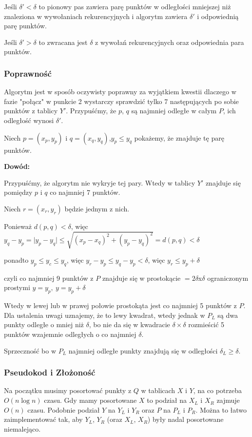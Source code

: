 \begin{itemize}
		Jeśli $\delta'<\delta$ to pionowy pas zawiera parę punktów w odległości mniejszej niż znaleziona w  wywołaniach rekurencyjnych i algorytm zawiera $\delta'$ i odpowiednią parę punktów.
		
		Jeśli $\delta'>\delta$ to zwracana jest $\delta$ z wywołań rekurencyjnych oraz odpowiednia para punktów.
\end{itemize}

\subsubsection{Poprawność}
Algorytm jest w sposób oczywisty poprawny za wyjątkiem kwestii dlaczego w fazie "połącz" w punkcie 2 wystarczy sprawdzić tylko 7 następujących po sobie punktów z tablicy $Y'$. Przypuśćmy, że $p$, $q$ są najmniej odległe w całym $P$, ich odległość wynosi $\delta'$.

Niech 
$p=(x_p,y_p)$ i $q=(x_q,y_q)$,\tab \tab $y_p \leq y_q$
pokażemy, że znajduje tę parę punktów.

\textbf{Dowód: }

Przypuśćmy, że algorytm nie wykryje tej pary. Wtedy w tablicy $Y'$ znajduje się pomiędzy $p$ i $q$ co najmniej 7 punktów.

Niech $r=(x_r,y_r)$ będzie jednym z nich.

Ponieważ $d(p,q)<\delta$, więc $y_q-y_p = \vert y_p - y_q \vert \leq \sqrt{(x_p-x_q)^2+(y_p-y_q)^2}=d(p,q)<\delta$

ponadto $y_p\leq y_c\leq y_q$, więc $y_r-y_p \leq y_q-y_p<\delta$, więc $y_r\leq y_p + \delta$

czyli co najmniej 9 punktów z $P$ znajduje się w prostokącie $=2\delta$x$\delta$ ograniczonym prostymi $y=y_p,\ y=y_p+\delta$

Wtedy w lewej lub w prawej połowie prostokąta jest co najmniej 5 punktów z $P$. Dla ustalenia uwagi uznajemy, że to lewy kwadrat, wtedy jednak w $P_L$ są dwa punkty odległe o mniej niż $\delta$, bo nie da się w kwadracie $\delta \times \delta$ rozmieścić 5 punktów wzajemnie odległych o co najmniej $\delta$.

Sprzeczność bo w $P_L$ najmniej odległe punkty znajdują się w odległości $\delta_L \geq \delta$.

\subsubsection{Pseudokod i Złożoność}
Na początku musimy posortować punkty z $Q$ w tablicach $X$ i $Y$, na co potrzeba $O(n \log n)$ czasu. Gdy mamy posortowane $X$ to podział na $X_L$ i $X_R$ zajmuje $O(n)$ czasu. Podobnie podział $Y$ na $Y_L$ i $Y_R$ oraz $P$ na $P_L$ i $P_R$. Można to łatwo zaimplementować tak, aby $Y_L$, $Y_R$ (oraz $X_L$, $X_R$) były nadal posortowane niemalejąco.

